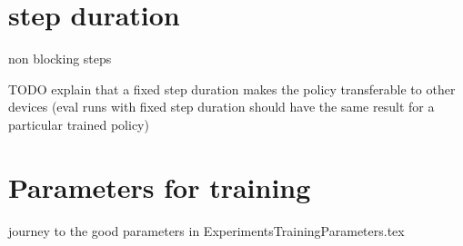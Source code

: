 \section{step duration}
non blocking steps

TODO explain that a fixed step duration makes the policy transferable to other devices (eval runs with fixed step duration should have the same result for a particular trained policy)

\section{Parameters for training}

journey to the good parameters in ExperimentsTrainingParameters.tex